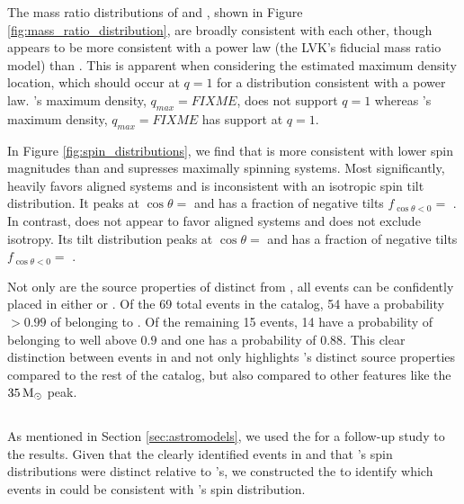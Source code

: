 The mass ratio distributions of \popA{} and \popB{}, shown in Figure \ref{fig:mass_ratio_distribution}, are broadly consistent with each other, though \popB{} appears to be more consistent with a power law (the LVK's fiducial mass ratio model) than \popA{}. This is apparent when considering the estimated maximum density location, which should occur at $q=1$ for a distribution consistent with a power law. \popA{}'s maximum density, $q_{max} = FIXME$, does not support $q=1$ whereas \popB{}'s maximum density, $q_{max} = FIXME$ has support at $q=1$. 

In Figure \ref{fig:spin_distributions}, we find that \popA{} is more consistent with lower spin magnitudes than \popB{} and supresses maximally spinning systems. Most significantly, \popA{} heavily favors aligned systems and is inconsistent with an isotropic spin tilt distribution. It peaks at $\cos{\theta}=$ \result{$\CIPlusMinus{\macros[CosTilt][Base][PeakA][max]}$} and has a fraction of negative tilts $f_{\cos{\theta} < 0} = $ \result{$\CIPlusMinus{\macros[CosTilt][Base][PeakA][negfrac]}$}. In contrast, \popB{} does not appear to favor aligned systems and does not exclude isotropy. Its tilt distribution peaks at $\cos{\theta}=$ \result{$\CIPlusMinus{\macros[CosTilt][Base][ContinuumB][max]}$} and has a fraction of negative tilts $f_{\cos{\theta} < 0} = $ \result{$\CIPlusMinus{\macros[CosTilt][Base][ContinuumB][negfrac]}$}.

Not only are the source properties of \popA{} distinct from \popB{}, all events can be confidently placed in either \popA{} or \popB{}. Of the 69 total events in the catalog, 54 have a probability $> 0.99$ of belonging to \popB{}. Of the remaining 15 events, 14 have a probability of belonging to \popA{} well above $0.9$ and one has a probability of $0.88$. This clear distinction between events in \popA{} and \popB{} not only highlights \popA{}'s distinct source properties compared to the rest of the catalog, but also compared to other features like the $35 {\,\rm M}_\odot$ peak. 

\subsection{\comp{}}

As mentioned in Section \ref{sec:astromodels}, we used the \comp{} for a follow-up study to the \base{} results. Given that the \base{} clearly identified \result{$\CIPlusMinus{\macros[NumEvents][Base][PeakA]}$} events in \popA{} and that \popA{}'s spin distributions were distinct relative to \popB{}'s, we constructed the \comp{} to identify which events in \popB{} could be consistent with \popA{}'s spin distribution. 

